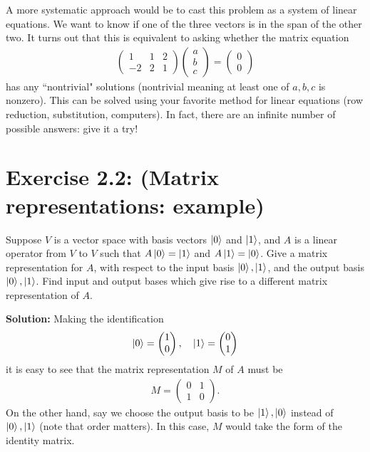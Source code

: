 \documentclass{book}
\begin{document}
    A more systematic approach would be to cast this problem as a system of linear equations. We want to know if one of the three vectors is in the span of the other two. It turns out that this is equivalent to asking whether the matrix equation
    \begin{align}
    \begin{pmatrix}
        1 & 1 & 2 \\
        -2 & 2 & 1
    \end{pmatrix}
    \begin{pmatrix}
        a \\
        b \\
        c
    \end{pmatrix}
    =\begin{pmatrix}
        0 \\ 
        0
    \end{pmatrix}
    \end{align}
    has any ``nontrivial" solutions (nontrivial meaning at least one of $a, b, c$ is nonzero). This can be solved using your favorite method for linear equations (row reduction, substitution, computers). In fact, there are an infinite number of possible answers: give it a try!

\section*{Exercise 2.2: (Matrix representations: example)}
    Suppose $V$ is a vector space with basis vectors $\ket{0}$ and $\ket{1}$, and $A$ is a linear operator from $V$ to $V$ such that $A\ket{0}=\ket{1}$ and $A\ket{1}=\ket{0}$. Give a matrix representation for $A$, with respect to the input basis $\ket{0}, \ket{1}$, and the output basis $\ket{0}, \ket{1}$. Find input and output bases which give rise to a different matrix representation of $A$.
    
    \textbf{Solution:} Making the identification
    \begin{align}
    \ket{0} =
    \begin{pmatrix}
        1 \\
        0
    \end{pmatrix}, \quad
    \ket{1} =
    \begin{pmatrix}
        0 \\
        1
    \end{pmatrix}
    \end{align}
    it is easy to see that the matrix representation $M$ of $A$ must be 
    \begin{align}
        M = 
        \begin{pmatrix}
            0 & 1 \\
            1 & 0
        \end{pmatrix}.
    \end{align}
    On the other hand, say we choose the output basis to be $\ket{1},\ket{0}$ instead of $\ket{0},\ket{1}$ (note that order matters). In this case, $M$ would take the form of the identity matrix.
\end{document}
